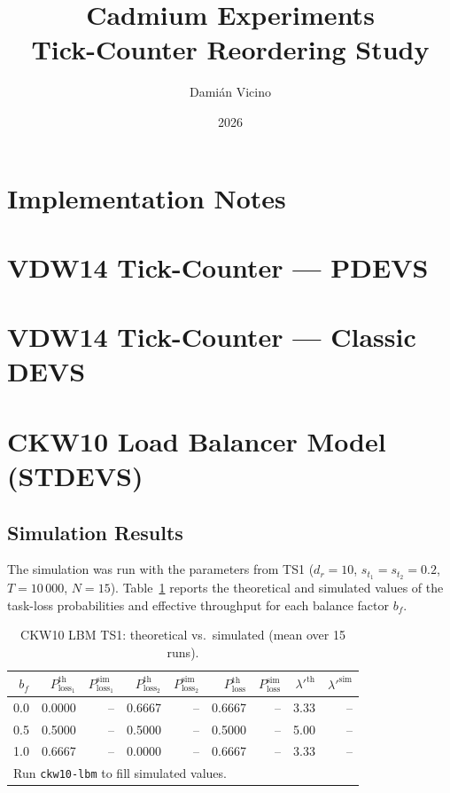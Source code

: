 \documentclass[11pt,a4paper]{article}
\title{Cadmium Experiments\\
  \large Tick-Counter Reordering Study}
\author{Damián Vicino}
\date{2026}
\begin{document}
\maketitle
\tableofcontents
\clearpage

\section{Implementation Notes}


\clearpage
\section{VDW14 Tick-Counter --- PDEVS}


\clearpage
\section{VDW14 Tick-Counter --- Classic DEVS}


\clearpage
\section{CKW10 Load Balancer Model (STDEVS)}
\label{sec:ckw10-lbm}


\subsection*{Simulation Results}
\label{sec:ckw10-lbm-results}

The simulation was run with the parameters from TS1 ($d_r=10$,
$s_{t_1}=s_{t_2}=0.2$, $T=10\,000$, $N=15$).
Table~\ref{tab:ckw10-lbm} reports the theoretical and simulated values
of the task-loss probabilities and effective throughput for each balance
factor $b_f$.

\begin{table}[h!]
\centering
\caption{CKW10 LBM TS1: theoretical vs.\ simulated (mean over 15 runs).}
\label{tab:ckw10-lbm}
\footnotesize
\begin{tabular}{r|rr|rr|rr|rr}
\toprule
$b_f$ &
$P^{\text{th}}_{\text{loss}_1}$ & $P^{\text{sim}}_{\text{loss}_1}$ &
$P^{\text{th}}_{\text{loss}_2}$ & $P^{\text{sim}}_{\text{loss}_2}$ &
$P^{\text{th}}_{\text{loss}}$   & $P^{\text{sim}}_{\text{loss}}$   &
$\lambda'^{\text{th}}$ & $\lambda'^{\text{sim}}$ \\
\midrule
0.0 & 0.0000 & -- & 0.6667 & -- & 0.6667 & -- & 3.33 & -- \\
0.5 & 0.5000 & -- & 0.5000 & -- & 0.5000 & -- & 5.00 & -- \\
1.0 & 0.6667 & -- & 0.0000 & -- & 0.6667 & -- & 3.33 & -- \\
\bottomrule
\multicolumn{9}{l}{\footnotesize Run \texttt{ckw10-lbm} to fill simulated values.}
\end{tabular}
\end{table}
\end{document}

